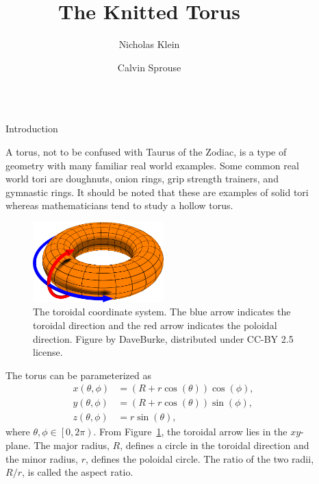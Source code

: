 \documentclass{beamer}
\title{The Knitted Torus}
\author{Nicholas Klein \and Calvin Sprouse}
\institute{Department of Mathematics, Central Washington University}
\newlength{\sepwidth}
\newlength{\colwidth}
\newcommand{\separatorcolumn}{\begin{column}{\sepwidth}\end{column}}
\begin{document}
\begin{frame}[t]
\begin{columns}[t]
\separatorcolumn\separatorcolumn%

\begin{column}{\colwidth}
\begin{block}{Introduction}

A torus, not to be confused with Taurus of the Zodiac, is a type of geometry with many familiar real world examples. Some common real world tori are doughnuts, onion rings, grip strength trainers, and gymnastic rings. It should be noted that these are examples of solid tori whereas mathematicians tend to study a hollow torus.

\bigskip
\begin{figure}[htbp]
    \centering
    \includegraphics[width=0.5\textwidth]{figures/poloidal.png}
    \caption{The toroidal coordinate system. The blue arrow indicates the toroidal direction and the red arrow indicates the poloidal direction. Figure by DaveBurke, distributed under CC-BY 2.5 license.}
    \label{fig:torus_coords}
\end{figure}

The torus can be parameterized as
\begin{align*}
x(\theta, \phi) &= \left(R + r\cos(\theta)\right)\cos(\phi), \\
y(\theta, \phi) &= \left(R + r\cos(\theta)\right)\sin(\phi), \\
z(\theta, \phi) &= r\sin(\theta),
\end{align*}
where \(\theta,\phi\in\left[0,2\pi\right)\). From Figure~\ref{fig:torus_coords}, the toroidal arrow lies in the \(xy\)-plane. The major radius, \(R\), defines a circle in the toroidal direction and the minor radius, \(r\), defines the poloidal circle. The ratio of the two radii, \(R/r\), is called the aspect ratio.


\end{block}
\end{column}
\end{columns}
\end{frame}
\end{document}

